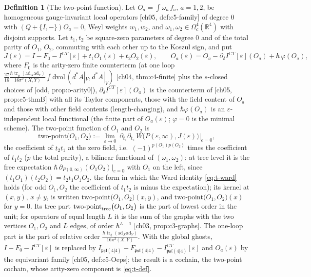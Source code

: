 \documentclass[11pt]{report}
\theoremstyle{plain}
\theoremstyle{definition}
\newtheorem{definition}[theorem]{Definition}
\numberwithin{equation}{chapter}
\newcommand{\unit}{\tfrac{\hbar\operatorname{tr}_{\mathfrak g}(\mathrm{ad}_X\mathrm{ad}_Y)}{16\pi^2(X,Y)}}
\newcommand{\TP}[2]{\mathrm{two\mbox{-}point}\big(#1,#2\big)}
\newcommand{\TPz}[2]{\mathrm{two\mbox{-}point}_{\rm tree}\big(#1,#2\big)}
\begin{document}
\begin{definition}[The two-point function]
\label{def:t-2pt}
Let $O_a=\int\omega_a\,f_a$, $a=1,2$, be homogeneous gauge-invariant local operators [ch05, def:c5-family] of degree $0$ with $(Q+\{I,-\})O_a=0$, Weyl weights $w_1,w_2$, and $\omega_1,\omega_2\in\Omega^4_c(\mathbb R^4)$ with disjoint supports. Let $t_1,t_2$ be square-zero parameters of degree $0$ and of the total parity of $O_1$, $O_2$, commuting with each other up to the Koszul sign, and put
\begin{equation}
J(\varepsilon)=I-F_0-I^{CT}[\varepsilon]+t_1O_1(\varepsilon)+t_2O_2(\varepsilon),\qquad O_a(\varepsilon)=O_a-\partial_\delta I^{CT}[\varepsilon](O_a)+\hbar\,\varphi(O_a),
\label{eq:t-J}
\end{equation}
where $F_0$ is the arity-zero finite counterterm (at one loop $\tfrac{27}{16}\unit\int\mathrm{dvol}\,(d^*A|_V,d^*A|_V)$ [ch04, thm:c4-finite] plus the $s$-closed choices of [odd, prop:o-arity0]), $\partial_\delta I^{CT}[\varepsilon](O_a)$ is the counterterm of [ch05, prop:c5-thmB] with all its Taylor components, those with the field content of $O_a$ and those with other field contents (length-changing), and $\hbar\varphi(O_a)$ is an $\varepsilon$-independent local functional (the finite part of $O_a(\varepsilon)$; $\varphi=0$ is the minimal scheme). The two-point function of $O_1$ and $O_2$ is
\begin{equation}
\TP{O_1}{O_2}:=\lim_{\varepsilon\to0}\ \partial_{t_1}\partial_{t_2}\,W\big(P(\varepsilon,\infty),J(\varepsilon)\big)\Big|_{e=0},
\label{eq:t-def}
\end{equation}
the coefficient of $t_2t_1$ at the zero field, i.e.\ $(-1)^{p(O_1)p(O_2)}$ times the coefficient of $t_1t_2$ ($p$ the total parity), a bilinear functional of $(\omega_1,\omega_2)$; at tree level it is the free expectation $\hbar\,\partial_{P(0,\infty)}(O_1O_2)|_{e=0}$ with $O_1$ on the left, since $(t_1O_1)(t_2O_2)=t_2t_1O_1O_2$, the form in which the Ward identity \eqref{eq:t-ward} holds (for odd $O_1,O_2$ the coefficient of $t_1t_2$ is minus the expectation); its kernel at $(x,y)$, $x\neq y$, is written $\TP{O_1}{O_2}(x,y)$, and $\TP{O_1}{O_2}(x)$ for $y=0$. Its tree part $\TPz{O_1}{O_2}$ is the part of lowest order in the unit; for operators of equal length $L$ it is the sum of the graphs with the two vertices $O_1,O_2$ and $L$ edges, of order $\hbar^{L-1}$ [ch03, prop:c3-graphs]. The one-loop part is the part of relative order $\unit$. With the global ghosts, $I-F_0-I^{CT}[\varepsilon]$ is replaced by $I_{\mathfrak{psl}(4|4)}-F_{\mathfrak{psl}(4|4)}-I^{CT}_{\mathfrak{psl}(4|4)}[\varepsilon]$ and $O_a(\varepsilon)$ by the equivariant family [ch05, def:c5-Oeps]; the result is a cochain, the two-point cochain, whose arity-zero component is \eqref{eq:t-def}.
\end{definition}
\end{document}
